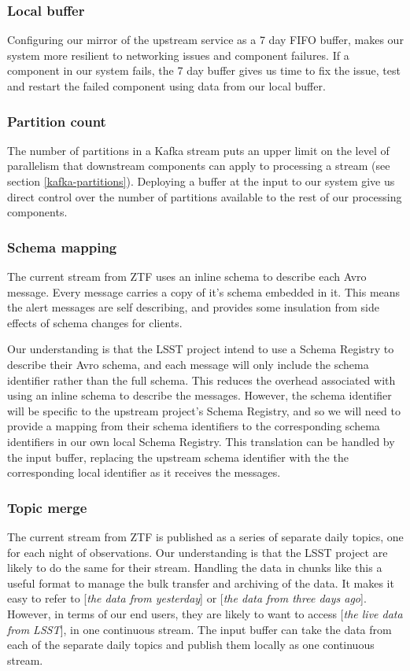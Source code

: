 \documentclass{article}
\newcommand{\avro} {Avro\xspace}
\newcommand{\kafka} {Kafka\xspace}
\newcommand{\schemaregistry} {Schema Registry\xspace}
\newcommand{\ztf} {ZTF\xspace}
\newcommand{\lsst} {LSST\xspace}
\begin{document}
\subsubsection{Local buffer}
\label{stage-1.local-buffer}
Configuring our mirror of the upstream service as a 7 day FIFO buffer, makes our system more resilient to networking issues and component failures.
If a component in our system fails, the 7 day buffer gives us time to fix the issue, test and restart the failed component using data from our local buffer.

\subsubsection{Partition count}
\label{stage-1.partition-count}
The number of partitions in a \kafka stream puts an upper limit on the level of parallelism that downstream components can apply to processing a stream (see section \ref{kafka-partitions}).
Deploying a buffer at the input to our system give us direct control over the number of partitions available to the rest of our processing components.

\subsubsection{Schema mapping}
\label{stage-1.schema-mapping}
The current stream from \ztf uses an inline schema to describe each \avro message.
Every message carries a copy of it's schema embedded in it.
This means the alert messages are self describing, and provides some insulation from side effects of schema changes for clients.

Our understanding is that the \lsst project intend to use a \schemaregistry to describe their \avro schema, and each message will only include the schema identifier rather than the full schema. This reduces the overhead associated with using an inline schema to describe the messages. However, the schema identifier will be specific to the upstream project's \schemaregistry, and so we will need to provide a mapping from their schema identifiers to the corresponding schema identifiers in our own local \schemaregistry.
This translation can be handled by the input buffer, replacing the upstream schema identifier with the the corresponding local identifier as it receives the messages.

\subsubsection{Topic merge}
\label{stage-1.topic-merge}
The current stream from \ztf is published as a series of separate daily topics, one for each night of observations. Our understanding is that the \lsst project are likely to do the same for their stream.
Handling the data in chunks like this a useful format to manage the bulk transfer and archiving of the data. It makes it easy to refer to [\textit{the data from yesterday}] or [\textit{the data from three days ago}]. However, in terms of our end users, they are likely to want to access [\textit{the live data from \lsst}], in one continuous stream.
The input buffer can take the data from each of the separate daily topics and publish them locally as one continuous stream.
\end{document}
